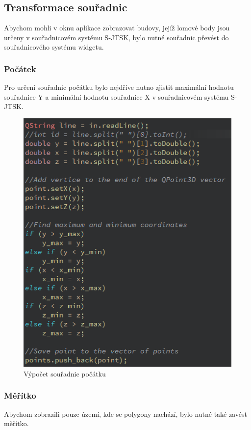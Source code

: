 \documentclass[11pt]{article}
\begin{document}
\subsection{Transformace souřadnic}
	Abychom mohli v oknu aplikace zobrazovat budovy, jejíž lomové body jsou určeny v souřadnicovém systému S-JTSK, bylo nutné souřadnic převést do souřadnicového systému widgetu. 
	
\subsubsection{Počátek}
	Pro určení souřadnic počátku bylo nejdříve nutno zjistit maximální hodnotu souřadnice Y a minimální hodnotu souřadnice X v souřadnicovém systému S-JTSK. 
	
\begin{figure}[htbh]
	\centering
	\includegraphics[scale=0.8]{images/U2_problem_pocatek.png} 
	\caption{Výpočet souřadnic počátku}
	\label{fig:problem_origin}
\end{figure} 
	
\subsubsection{Měřítko}
Abychom zobrazili pouze území, kde se polygony nachází, bylo nutné také zavést měřítko.
	
\end{document}
